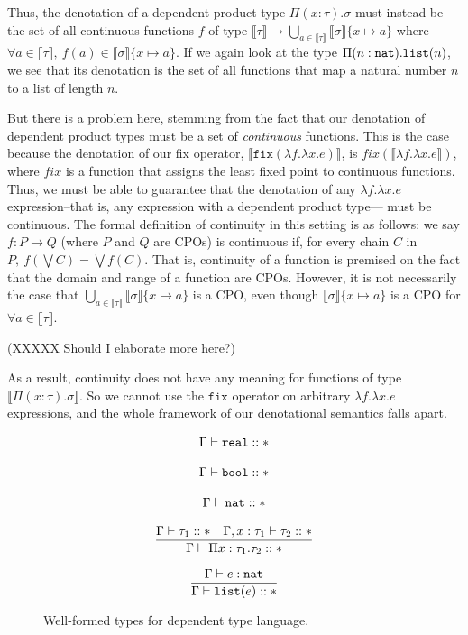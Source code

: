 Thus, the denotation of a dependent product type $\Pi(x:\tau).\sigma$ must instead be the set of all
continuous functions $f$ 
of type $\llbracket \tau \rrbracket \rightarrow \bigcup_{a \in \llbracket \tau \rrbracket} \llbracket \sigma \rrbracket\{x \mapsto a\}$
where $\forall a \in \llbracket \tau \rrbracket, \ f(a) \in \llbracket \sigma \rrbracket\{x \mapsto a\}$. If we again look at the 
type $\Pi(n:\texttt{nat}).\texttt{list}(n)$, we see that its denotation is the set of all functions that map a natural number $n$ 
to a list of length $n$.

But there is a problem here, stemming from the fact that our denotation of dependent product types must be a 
set of \emph{continuous} functions. This is the case because the denotation of our fix operator,
$\llbracket \texttt{fix}(\lambda f. \lambda x.e) \rrbracket$, is $fix(\llbracket \lambda f. \lambda x.e \rrbracket)$, where $fix$ 
is a function that assigns the least fixed point to continuous functions. Thus, we must be able to guarantee that the denotation of any $\lambda f. \lambda x.e$ expression--that is, any expression with a dependent product type--- must be continuous. The formal definition of continuity in this setting is as 
follows: we say $f: P \rightarrow Q$ (where $P$ and $Q$ are CPOs) is continuous if, for every chain $C$ in $P, \ 
f(\bigvee C) = \bigvee f(C)$. That is, continuity of a function is premised on the fact that the domain and range of
a function are CPOs. However, it is not necessarily the case that
 $\bigcup_{a \in \llbracket \tau \rrbracket} \llbracket \sigma \rrbracket\{ x \mapsto a\}$ is a CPO, even though 
 $\llbracket \sigma \rrbracket\{x\mapsto a\}$ is a CPO for $\forall a \in \llbracket \tau \rrbracket$.
 
(XXXXX Should I elaborate more here?)

As a result, continuity does not have any meaning for functions of type $\llbracket \Pi (x: \tau).\sigma \rrbracket$. 
So we cannot use the $\texttt{fix}$ operator on arbitrary $\lambda f. \lambda x.e$ expressions, and the whole
framework of our denotational semantics falls apart. 
 
 \begin{figure}
\[
\begin{array}{c}
\Gamma \vdash \texttt{real} :: * \\ \\
\Gamma \vdash \texttt{bool} :: *\\ \\
\Gamma \vdash \texttt{nat} :: * \\ \\ 
\dfrac{\Gamma \vdash \tau_1 :: * \ \ \ \Gamma, x:\tau_1 \vdash \tau_2 :: *}{\Gamma \vdash \Pi x:\tau_1.\tau_2 :: *} \\ \\
\dfrac{\Gamma \vdash e : \texttt{nat}}{\Gamma \vdash \texttt{list}(e) :: *} 
\end{array}
\]
\caption{Well-formed types for dependent type language.}
\end{figure}

